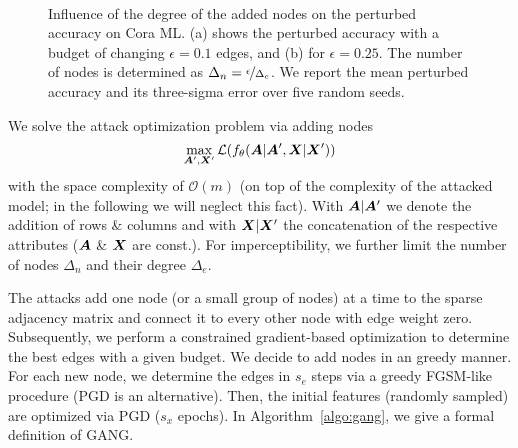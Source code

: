 \documentclass[sigconf,authordraft]{acmart}
\newcommand{\adj}{\mA}
\newcommand{\features}{\mX}
\begin{document}
\begin{figure}[t]
  \centering
  \hbox{\hspace{45pt} \resizebox{0.7\linewidth}{!}{}}
  \vspace{-14pt}
  \caption{Influence of the degree of the added nodes on the perturbed accuracy on Cora ML. (a) shows the perturbed accuracy with a budget of changing \(\epsilon=0.1\) edges, and (b) for \(\epsilon=0.25\). The number of nodes is determined as \(\Delta_n = \nicefrac{\epsilon}{\Delta_e}\). We report the mean perturbed accuracy and its three-sigma error over five random seeds. \label{fig:gangnodeeffectiveness}}
\end{figure}

We solve the attack optimization problem via adding nodes
\begin{equation}\label{eq:gang}
  \max_{\adj^\prime, \features^\prime} \mathcal{L}(f_{\theta}(\adj | \adj^\prime, \features | \features^\prime))
\end{equation}
with the space complexity of \(\mathcal{O}(m)\) (on top of the complexity of the attacked model; in the following we will neglect this fact). With \(\adj | \adj^\prime\) we denote the addition of rows \& columns and with \(\features | \features^\prime\) the concatenation of the respective attributes (\(\adj\) \& \(\features\) are const.). For imperceptibility, we further limit the number of nodes \(\Delta_n\) and their degree \(\Delta_e\).

The attacks add one node (or a small group of nodes) at a time to the sparse adjacency matrix and connect it to every other node with edge weight zero. Subsequently, we perform a constrained gradient-based optimization to determine the best edges with a given budget. We decide to add nodes in an greedy manner. For each new node, we determine the edges in \(s_e\) steps via a greedy FGSM-like procedure (PGD is an alternative). Then, the initial features (randomly sampled) are optimized via PGD (\(s_x\) epochs). In Algorithm~\ref{algo:gang}, we give a formal definition of GANG.
\end{document}

